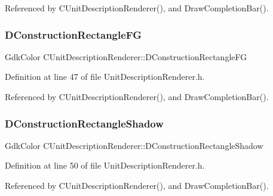 Referenced by C\+Unit\+Description\+Renderer(), and Draw\+Completion\+Bar().

\hypertarget{classCUnitDescriptionRenderer_a2f4f541a008668f1b8fc55500443c1a3}{}\label{classCUnitDescriptionRenderer_a2f4f541a008668f1b8fc55500443c1a3} 
\subsubsection{\texorpdfstring{D\+Construction\+Rectangle\+FG}{DConstructionRectangleFG}}
{\footnotesize\ttfamily Gdk\+Color C\+Unit\+Description\+Renderer\+::\+D\+Construction\+Rectangle\+FG\hspace{0.3cm}{\ttfamily [protected]}}



Definition at line 47 of file Unit\+Description\+Renderer.\+h.



Referenced by C\+Unit\+Description\+Renderer(), and Draw\+Completion\+Bar().

\hypertarget{classCUnitDescriptionRenderer_a8e19ce3520d89f775dc5de84c2985221}{}\label{classCUnitDescriptionRenderer_a8e19ce3520d89f775dc5de84c2985221} 
\subsubsection{\texorpdfstring{D\+Construction\+Rectangle\+Shadow}{DConstructionRectangleShadow}}
{\footnotesize\ttfamily Gdk\+Color C\+Unit\+Description\+Renderer\+::\+D\+Construction\+Rectangle\+Shadow\hspace{0.3cm}{\ttfamily [protected]}}



Definition at line 50 of file Unit\+Description\+Renderer.\+h.



Referenced by C\+Unit\+Description\+Renderer(), and Draw\+Completion\+Bar().

\hypertarget{classCUnitDescriptionRenderer_acc5f08d377a050f778614561a0b12a6c}{}\label{classCUnitDescriptionRenderer_acc5f08d377a050f778614561a0b12a6c} 
